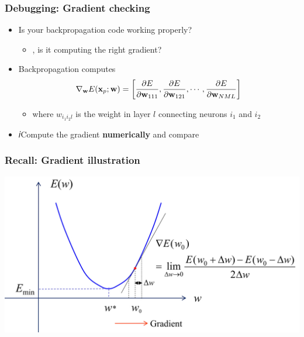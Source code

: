 \documentclass[12pt,notes,mathserif]{beamer}
\begin{document}
\begin{frame}[c]
	\frametitle{Debugging: Gradient checking}
	\begin{itemize}
		\item Is your backpropagation code working properly?
		      \begin{itemize}
			      \item \ie, is it computing the right gradient?
		      \end{itemize}
		\item Backpropagation computes
		      \[
			      \nabla_{\mathbf{w}}E(\mathbf{x}_p;\mathbf{w})=
			      \left[
				      \frac{\partial E}{\partial \mathbf{w}_{111}},
				      \frac{\partial E}{\partial \mathbf{w}_{121}},\cdots,
				      \frac{\partial E}{\partial \mathbf{w}_{NML}}
				      \right]
		      \]
		      \begin{itemize}
			      \item where $w_{i_1i_2l}$ is the weight in layer $l$ connecting neurons $i_1$ and $i_2$
		      \end{itemize}
		\item 𝑖Compute the gradient {\bf numerically} and compare
	\end{itemize}
\end{frame}

\begin{frame}[c]
	\frametitle{Recall: Gradient illustration}
	\begin{center}
		\includegraphics[width=0.99\linewidth]{fig/lec612.jpg}
	\end{center}
\end{frame}
\end{document}
